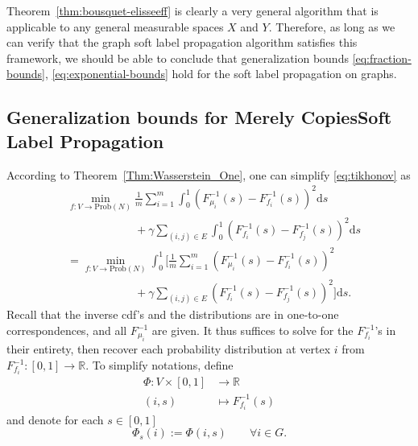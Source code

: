 \documentclass[letterpaper]{article} %
\begin{document}
Theorem~\ref{thm:bousquet-elisseeff} is clearly a very general algorithm that is applicable to any general measurable spaces $X$ and $Y$. Therefore, as long as we can verify that the graph soft label propagation algorithm satisfies this framework, we should be able to conclude that generalization bounds \eqref{eq:fraction-bounds}, \eqref{eq:exponential-bounds} hold for the soft label propagation on graphs.




\subsection{Generalization bounds for {\color{red}Merely Copies}Soft Label Propagation}
According to  Theorem~\ref{Thm:Wasserstein_One}, one can simplify \eqref{eq:tikhonov} as 
\begin{equation*}
  \begin{aligned}
    &\min_{f:V\to \mathrm{Prob}(N)}\frac{1}{m}\sum_{i=1}^m \int_0^1 \left(F_{\mu_i}^{-1}\left( s \right)-F_{f_i}^{-1}\left( s \right)\right)^2\mathrm{d}s \\
    &\qquad \qquad\qquad +\gamma\sum_{\left( i,j \right)\in E}\int_0^1 \left( F_{f_i}^{-1}\left( s \right)-F_{f_j}^{-1}\left( s \right) \right)^2\mathrm{d}s\\
    &=\min_{f:V\to \mathrm{Prob}(N)}\int_0^1 \Big[ \frac{1}{m} \sum_{i=1}^m \left(F_{\mu_i}^{-1}\left( s \right)-F_{f_i}^{-1}\left( s \right)\right)^2\\
    &\qquad \qquad \qquad +\gamma \sum_{\left( i,j \right)\in E}\left( F_{f_i}^{-1}\left( s \right)-F_{f_j}^{-1}\left( s \right) \right)^2  \Big]\mathrm{d}s.
  \end{aligned}
  \end{equation*}
Recall that the inverse cdf's and the distributions are in one-to-one correspondences, and all $F_{\mu_i}^{-1}$ are given. It thus suffices to solve for the $F_{f_i}^{-1}$'s in their entirety, then recover each probability distribution at vertex $i$ from $F_{f_i}^{-1}:[0,1]\rightarrow\mathbb{R}$. To simplify notations, define
\begin{equation*}
  \begin{aligned}
    \Phi:V\times \left[ 0,1 \right]&\rightarrow \mathbb{R}\\
    \left( i,s \right)&\mapsto F_{f_i}^{-1}\left( s \right)
  \end{aligned}
\end{equation*}
and denote for each $s\in \left[ 0,1 \right]$
\begin{equation*}
  \Phi_s \left( i \right):=\Phi \left( i,s \right)\qquad\forall i\in G.
\end{equation*}
\end{document}
